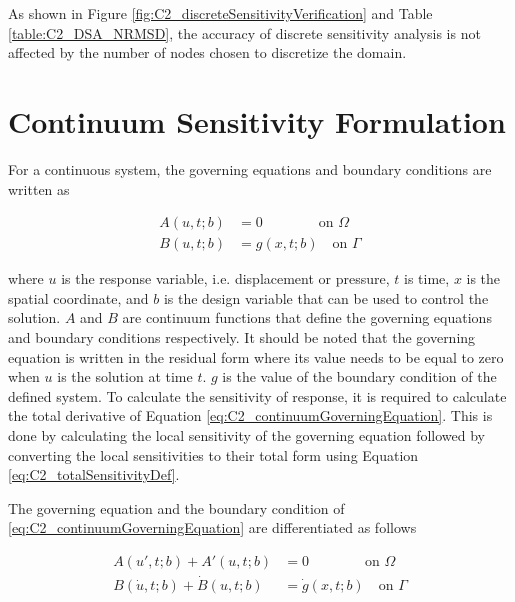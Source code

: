 As shown in Figure \ref{fig:C2_discreteSensitivityVerification} and Table \ref{table:C2_DSA_NRMSD}, the accuracy of discrete sensitivity analysis is not affected by the number of nodes chosen to discretize the domain.

\section{Continuum Sensitivity Formulation}
For a continuous system, the governing equations and boundary conditions are written as

\begin{subequations}\label{eq:C2_continuumGoverningEquation}
\begin{align}
	A(u, t; b) &= 0 \qquad \qquad \text{on } \Omega \\
	B(u, t; b) &= g(x, t; b) \quad \text{on } \Gamma
\end{align}	
\end{subequations}

where $u$ is the response variable, i.e. displacement or pressure, $t$ is time, $x$ is the spatial coordinate, and $b$ is the design variable that can be used to control the solution. $A$ and $B$ are continuum functions that define the governing equations and boundary conditions respectively. It should be noted that the governing equation is written in the residual form where its value needs to be equal to zero when $u$ is the solution at time $t$. $g$ is the value of the boundary condition of the defined system. To calculate the sensitivity of response, it is required to calculate the total derivative of Equation \eqref{eq:C2_continuumGoverningEquation}. This is done by calculating the local sensitivity of the governing equation followed by converting the local sensitivities to their total form using Equation \eqref{eq:C2_totalSensitivityDef}.

The governing equation and the boundary condition of \eqref{eq:C2_continuumGoverningEquation} are differentiated as follows

\begin{subequations}\label{eq:C2_continuumSensitivityFormulation}
\begin{align}
	A(u', t; b) + A'(u, t; b) &= 0 \qquad \qquad \text{on } \Omega \\
	B(\dot{u}, t; b) + \dot{B}(u, t; b) &= \dot{g}(x, t; b) \quad \text{on } \Gamma
\end{align}	
\end{subequations}

